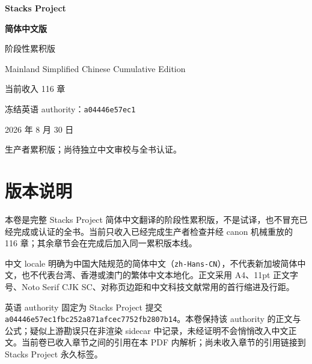 

\frontmatter
\begin{titlepage}
\thispagestyle{empty}
\centering
\vspace*{25mm}
{\fontsize{30}{38}\selectfont\bfseries Stacks Project\par}
\vspace{11mm}
{\fontsize{27}{34}\selectfont\bfseries 简体中文版\par}
\vspace{8mm}
{\Large 阶段性累积版\par}
\vspace{5mm}
{\large Mainland Simplified Chinese Cumulative Edition\par}
\vfill
{\large 当前收入 116 章\par}
\vspace{4mm}
{\normalsize 冻结英语 authority：\texttt{a04446e57ec1}\par}
\vspace{3mm}
{\normalsize 2026 年 8 月 30 日\par}
\vfill
{\small 生产者累积版；尚待独立中文审校与全书认证。\par}
\end{titlepage}

\chapter*{版本说明}
本卷是完整 Stacks Project 简体中文翻译的阶段性累积版，不是试译，也不冒充已经完成或认证的全书。当前只收入已经完成生产者检查并经 canon 机械重放的 116 章；其余章节会在完成后加入同一累积版本线。

中文 locale 明确为中国大陆规范的简体中文（\texttt{zh-Hans-CN}），不代表新加坡简体中文，也不代表台湾、香港或澳门的繁体中文本地化。正文采用 A4、11pt 正文字号、Noto Serif CJK SC、对称页边距和中文科技文献常用的首行缩进及行距。

英语 authority 固定为 Stacks Project 提交
\texttt{a04446e57ec1fbc252a871afcec7752fb2807b14}。本卷保持该 authority 的正文与公式；疑似上游勘误只在非渲染 sidecar 中记录，未经证明不会悄悄改入中文正文。当前卷已收入章节之间的引用在本 PDF 内解析；尚未收入章节的引用链接到 Stacks Project 永久标签。

